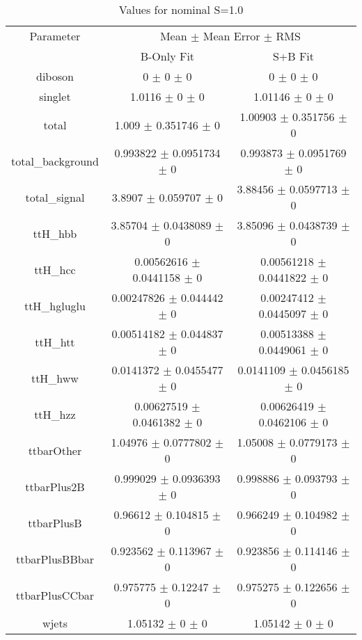 \begin{table}
\centering
\caption{Values for nominal S=1.0}
\begin{tabular}{ccc}
\toprule
Parameter & \multicolumn{2}{c}{Mean $\pm$ Mean Error $\pm$ RMS}\\
 & B-Only Fit & S+B Fit\\
\midrule
diboson & \num{0} $\pm$ \num{0} $\pm$ \num{0} & \num{0} $\pm$ \num{0} $\pm$ \num{0}\\
singlet & \num{1.0116} $\pm$ \num{0} $\pm$ \num{0} & \num{1.01146} $\pm$ \num{0} $\pm$ \num{0}\\
total & \num{1.009} $\pm$ \num{0.351746} $\pm$ \num{0} & \num{1.00903} $\pm$ \num{0.351756} $\pm$ \num{0}\\
total\_background & \num{0.993822} $\pm$ \num{0.0951734} $\pm$ \num{0} & \num{0.993873} $\pm$ \num{0.0951769} $\pm$ \num{0}\\
total\_signal & \num{3.8907} $\pm$ \num{0.059707} $\pm$ \num{0} & \num{3.88456} $\pm$ \num{0.0597713} $\pm$ \num{0}\\
ttH\_hbb & \num{3.85704} $\pm$ \num{0.0438089} $\pm$ \num{0} & \num{3.85096} $\pm$ \num{0.0438739} $\pm$ \num{0}\\
ttH\_hcc & \num{0.00562616} $\pm$ \num{0.0441158} $\pm$ \num{0} & \num{0.00561218} $\pm$ \num{0.0441822} $\pm$ \num{0}\\
ttH\_hgluglu & \num{0.00247826} $\pm$ \num{0.044442} $\pm$ \num{0} & \num{0.00247412} $\pm$ \num{0.0445097} $\pm$ \num{0}\\
ttH\_htt & \num{0.00514182} $\pm$ \num{0.044837} $\pm$ \num{0} & \num{0.00513388} $\pm$ \num{0.0449061} $\pm$ \num{0}\\
ttH\_hww & \num{0.0141372} $\pm$ \num{0.0455477} $\pm$ \num{0} & \num{0.0141109} $\pm$ \num{0.0456185} $\pm$ \num{0}\\
ttH\_hzz & \num{0.00627519} $\pm$ \num{0.0461382} $\pm$ \num{0} & \num{0.00626419} $\pm$ \num{0.0462106} $\pm$ \num{0}\\
ttbarOther & \num{1.04976} $\pm$ \num{0.0777802} $\pm$ \num{0} & \num{1.05008} $\pm$ \num{0.0779173} $\pm$ \num{0}\\
ttbarPlus2B & \num{0.999029} $\pm$ \num{0.0936393} $\pm$ \num{0} & \num{0.998886} $\pm$ \num{0.093793} $\pm$ \num{0}\\
ttbarPlusB & \num{0.96612} $\pm$ \num{0.104815} $\pm$ \num{0} & \num{0.966249} $\pm$ \num{0.104982} $\pm$ \num{0}\\
ttbarPlusBBbar & \num{0.923562} $\pm$ \num{0.113967} $\pm$ \num{0} & \num{0.923856} $\pm$ \num{0.114146} $\pm$ \num{0}\\
ttbarPlusCCbar & \num{0.975775} $\pm$ \num{0.12247} $\pm$ \num{0} & \num{0.975275} $\pm$ \num{0.122656} $\pm$ \num{0}\\
wjets & \num{1.05132} $\pm$ \num{0} $\pm$ \num{0} & \num{1.05142} $\pm$ \num{0} $\pm$ \num{0}\\
\bottomrule
\end{tabular}
\end{table}